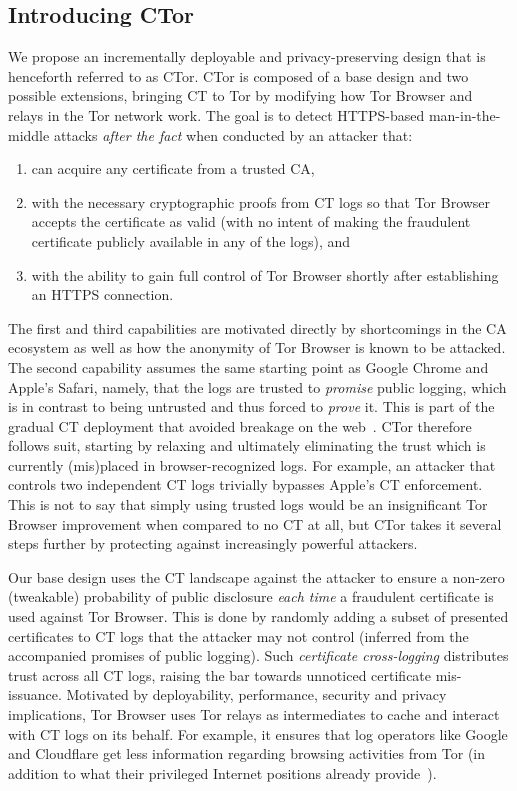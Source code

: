 \subsection{Introducing CTor}
We propose an incrementally deployable and privacy-preserving design that is
henceforth referred to as CTor.  CTor is composed of a base design and two
possible extensions, bringing CT to Tor by modifying how Tor Browser and
relays in the Tor network work.  The goal is to detect HTTPS-based
man-in-the-middle attacks \emph{after the fact} when conducted by an attacker
that:
\begin{enumerate}
	\item can acquire any certificate from a trusted CA,
	\item with the necessary cryptographic proofs from CT logs so that
		Tor Browser accepts the certificate as valid (with no intent of making
		the fraudulent certificate publicly available in any of the logs), and
	\item with the ability to gain full control of Tor Browser shortly after
		establishing an HTTPS connection.
\end{enumerate}

The first and third capabilities are motivated directly by shortcomings in the
CA ecosystem as well as how the anonymity of Tor Browser is known to be attacked.
The second capability assumes the same starting point as Google Chrome and
Apple's Safari, namely, that the logs are trusted to \emph{promise} public
logging, which is in contrast to being untrusted and thus forced to \emph{prove}
it.  This is part of the gradual CT deployment that avoided breakage on the
web~\cite{does-ct-break-the-web}.  CTor therefore follows suit, starting
by relaxing and ultimately eliminating the trust which is currently (mis)placed
in browser-recognized logs.  For example, an attacker that controls two
independent CT logs trivially bypasses Apple's CT enforcement.  This is not
to say that simply using trusted logs would be an insignificant Tor Browser
improvement when compared to no CT at all, but CTor takes it several steps
further by protecting against increasingly powerful attackers.

Our base design uses the CT landscape against the attacker to ensure a non-zero
(tweakable) probability of public disclosure \emph{each time} a fraudulent
certificate is used against Tor Browser.  This is done by randomly adding a
subset of presented certificates to CT logs that the attacker may not control
(inferred from the accompanied promises of public logging).  Such
\emph{certificate cross-logging} distributes trust across all CT logs,
raising the bar towards unnoticed certificate mis-issuance.
Motivated by deployability, performance, security and privacy implications,
Tor Browser uses Tor relays as intermediates to cache and interact with CT logs
on its behalf.  For example, it ensures that log operators like Google and
Cloudflare get less information regarding browsing activities from Tor (in
addition to what their privileged Internet positions already
provide~\cite{1mtrack,TorDNS}).

